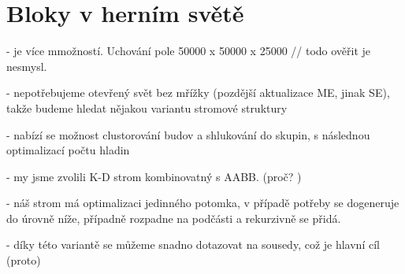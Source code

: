 
\section{Bloky v herním světě}


- je více mmožností. Uchování pole 50000 x 50000 x 25000 // todo ověřit
je nesmysl. 

- nepotřebujeme otevřený svět bez mřížky (pozdější aktualizace ME, jinak SE), takže budeme hledat nějakou variantu stromové struktury

- nabízí se možnost clustorování budov a shlukování do skupin, s následnou optimalizací počtu hladin

- my jsme zvolili K-D strom kombinovatný s AABB. (proč? )

- náš strom má optimalizaci jedinného potomka, v případě potřeby se dogeneruje do úrovně níže, případně rozpadne na podčásti a rekurzivně se přidá.

- díky této variantě se můžeme snadno dotazovat na sousedy, což je hlavní cíl (proto)

